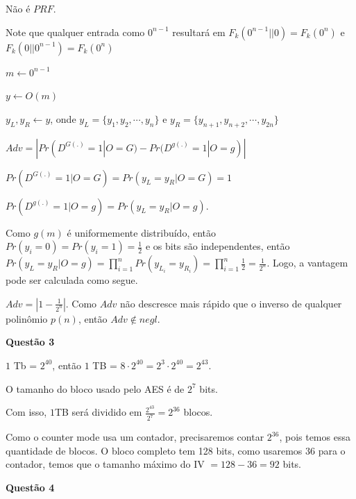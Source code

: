 \documentclass{article}
\begin{document}
    Não é $PRF$. 
    
    Note que qualquer entrada como $0^{n-1}$ resultará em $F_k(0^{n-1}||0) = F_k(0^n)$ e $F_k(0||0^{n-1}) = F_k(0^n)$

    \begin{algorithm}[H]
        \caption{Distinguidor $D$}

        $m \leftarrow 0^{n-1}$

        $y \leftarrow O(m)$
        
        $y_L, y_R \leftarrow y$, onde $y_L = \{y_1,y_2,\cdots,y_n \}$ e $y_R = \{y_{n+1},y_{n+2},\cdots,y_{2n} \}$


    \end{algorithm}

    $Adv = |Pr(D^{G(.)} = 1 | O = G) - Pr(D^{g(.)} = 1 | O = g)|$

    $Pr(D^{G(.)} = 1 | O = G) = Pr(y_L = y_R | O = G) = 1$

    $Pr(D^{g(.)} = 1 | O = g) = Pr(y_L = y_R | O = g)$. 
    
    Como $g(m)$ é uniformemente distribuído, então $Pr(y_i = 0) = Pr(y_i = 1) = \frac{1}{2}$ e os bits são independentes, então $Pr(y_L = y_R | O = g) = \prod_{i=1}^{n}Pr(y_{L_i} = y_{R_i}) = \prod_{i=1}^{n}\frac{1}{2} = \frac{1}{2^n}$. Logo, a vantagem pode ser calculada como segue.


    $Adv = |1 - \frac{1}{2^n}|$. Como $Adv$ não descresce mais rápido que o inverso de qualquer polinômio $p(n)$, então $Adv \notin negl$.

\textbf{Questão 3}

    $1$ Tb = $2^{40}$, então $1$ TB = $8 \cdot 2^{40} = 2^3 \cdot 2^{40} = 2^{43}$.

    O tamanho do bloco usado pelo AES é de $2^7$ bits.

    Com isso, $1$TB será dividido em $\frac{2^{43}}{2^7} = 2^{36}$ blocos.

    Como o counter mode usa um contador, precisaremos contar $2^{36}$, pois temos essa quantidade de blocos. O bloco completo tem 128 bits, como usaremos 36 para o contador, temos que o tamanho máximo do IV $= 128 - 36 = 92$ bits.


\textbf{Questão 4}
\end{document}
